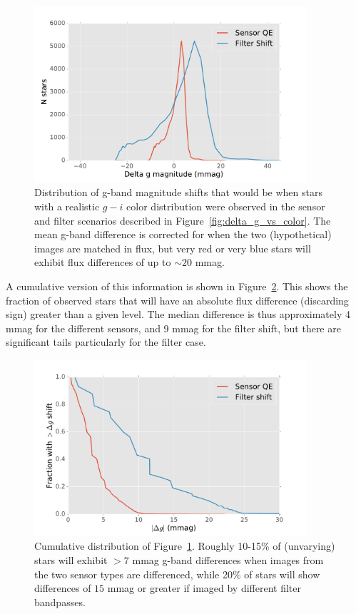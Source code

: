 \documentclass[DM]{lsstdoc}
\begin{document}
\begin{figure}
\includegraphics[width=0.9\textwidth]{figures/delta_g_histogram.pdf}
\caption{Distribution of g-band magnitude shifts that would be when stars with a
realistic $g-i$ color distribution were observed in the sensor and filter
scenarios described in Figure~\ref{fig:delta_g_vs_color}. The mean g-band
difference is corrected for when the two (hypothetical) images are matched in flux,
but very red or very blue stars will exhibit flux differences of up to $\sim 20$
mmag.
\label{fig:delta_g_histogram}}
\end{figure}

A cumulative version of this information is shown in
Figure~\ref{fig:delta_g_cumulative}. This shows the fraction of observed
stars that will have an absolute flux difference (discarding sign) greater than
a given level. The median difference is thus approximately 4 mmag for the
different sensors, and 9 mmag for the filter shift, but there are significant
tails particularly for the filter case.

\begin{figure}
\includegraphics[width=0.9\textwidth]{figures/delta_g_cumulative.pdf}
\caption{Cumulative distribution of Figure~\ref{fig:delta_g_histogram}. Roughly
10-15\% of (unvarying) stars will exhibit $>7$ mmag g-band differences when
images from the two sensor types are differenced, while 20\% of stars will show
differences of $15$ mmag or greater if imaged by different filter bandpasses.
\label{fig:delta_g_cumulative}}
\end{figure}
\end{document}
